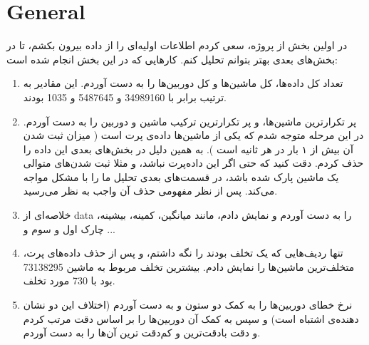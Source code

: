 \section{General}

در اولین بخش از پروژه، سعی کردم اطلاعات اولیه‌ای را از داده بیرون بکشم، تا در 
بخش‌های بعدی بهتر بتوانم تحلیل کنم. کارهایی که در این بخش انجام شده است:

\begin{enumerate}
    \item 
    تعداد کل داده‌ها، کل ماشین‌ها و کل دوربین‌ها را به دست آوردم. این مقادیر 
    به ترتیب برابر با 
    34989160
    و 
    5487645
    و 
    1035
    بودند.

    \item 
    پر تکرارترین ماشین‌ها، و پر تکرارترین ترکیب ماشین و دوربین را به دست آوردم. 
    در این مرحله متوجه شدم که یکی از ماشین‌ها داده‌ی پرت است (
        میزان ثبت شدن آن بیش از ۱ بار در هر ثانیه است
    ). به همین دلیل 
    در بخش‌های بعدی این داده را حذف کردم. دقت کنید که حتی اگر این داده‌پرت نباشد، 
    و مثلا ثبت شدن‌های متوالی یک ماشین پارک شده باشد، در قسمت‌های بعدی 
    تحلیل ما را با مشکل مواجه می‌کند. پس از نظر مفهومی حذف آن واجب به نظر می‌رسید.

    \item 
    خلاصه‌ای از 
    data
    را به دست آوردم و نمایش دادم، مانند میانگین، کمینه، بیشینه، چارک اول و سوم و ...

    \item 
    تنها ردیف‌هایی که یک تخلف بودند را نگه داشتم، و پس از حذف داده‌های پرت، متخلف‌ترین 
    ماشین‌ها را نمایش دادم. 
    بیشترین تخلف مربوط به ماشین
    73138295
    بود با 
    730
    مورد تخلف.

    \item 
    نرخ خطای دوربین‌ها را به کمک دو ستون
    و
    به دست آوردم (اختلاف این دو نشان‌ دهنده‌ی اشتباه است) و سپس به کمک آن دوربین‌ها را بر اساس دقت 
    مرتب کردم و دقت با‌دقت‌ترین و کم‌دقت ترین‌ آن‌ها را به دست آوردم.
\end{enumerate}